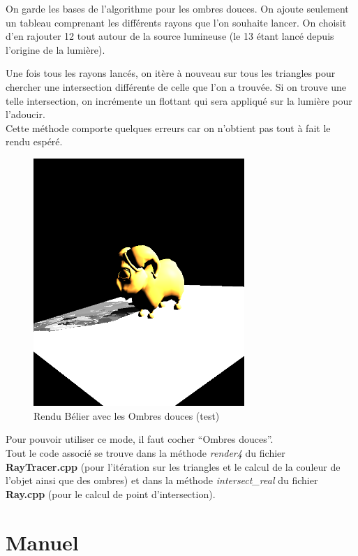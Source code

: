 \documentclass[a4paper,11pt,titlepage]{article}
\begin{document}
On garde les bases de l'algorithme pour les ombres douces. On ajoute seulement un tableau comprenant les différents rayons que l'on souhaite lancer. On choisit d'en rajouter 12 tout autour de la source lumineuse (le 13 étant lancé depuis l'origine de la lumière). 

Une fois tous les rayons lancés, on itère à nouveau sur tous les triangles pour chercher une intersection différente de celle que l'on a trouvée. Si on trouve une telle intersection, on incrémente un flottant qui sera appliqué sur la lumière pour l'adoucir.\\

Cette méthode comporte quelques erreurs car on n'obtient pas tout à fait le rendu espéré.

\begin{figure}[H]
 \begin{center}
 \includegraphics[width=8cm]{Rendu/OmbresD2.png}
 \end{center}

 \caption{Rendu Bélier avec les Ombres douces (test)}
 \label{rendu4}
\end{figure}

Pour pouvoir utiliser ce mode, il faut cocher ``Ombres douces''.\\

Tout le code associé se trouve dans la méthode \textit{render4} du fichier \textbf{RayTracer.cpp} (pour l'itération sur les triangles et le calcul de la couleur de l'objet ainsi que des ombres) et dans la méthode \textit{intersect\_real} du fichier \textbf{Ray.cpp} (pour le calcul de point d'intersection).


\section{Manuel}
\end{document}
